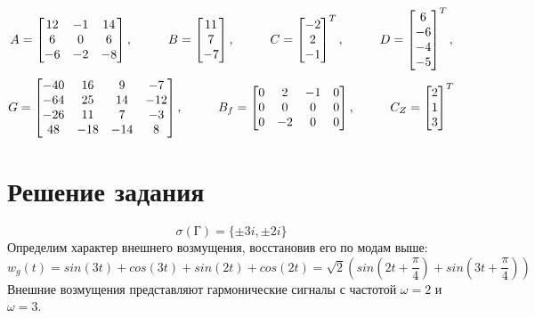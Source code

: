 $$
  A = \begin{bmatrix}
    12 & -1 & 14 \\
    6 & 0 & 6 \\
    -6 & -2 & -8 \\
\end{bmatrix}, \hspace*{1cm} B = \begin{bmatrix}
  11 \\
  7 \\
  -7 \\
\end{bmatrix}, \hspace*{1cm} C = \begin{bmatrix}
  -2 \\ 2 \\ -1 \\
\end{bmatrix}^T, \hspace*{1cm} D = \begin{bmatrix}
  6 \\
  -6 \\
  -4 \\
  -5 \\
\end{bmatrix}^T, 
$$
$$
G = \begin{bmatrix}
  -40 & 16 & 9 & -7 \\
  -64 & 25 & 14 & -12 \\
  -26 & 11 & 7 & -3 \\
  48 & -18 & -14 & 8 \\
\end{bmatrix}, \hspace*{1cm} B_f =\begin{bmatrix}
       0 & 2 & -1 & 0 \\
       0 & 0 & 0 & 0 \\
       0 & -2 & 0 & 0 \\
   \end{bmatrix}, \hspace*{1cm}
  C_Z = \begin{bmatrix}
    2 \\ 1 \\ 3 \\
\end{bmatrix}^T
$$

\section{Решение задания}

$$
  \sigma(\text{Г}) = \{ \pm 3i, \pm 2i \}
$$
Определим характер внешнего возмущения, восстановив его по модам выше:
$$
  w_g(t) = sin(3t) + cos(3t) + sin(2t) + cos(2t) = \sqrt{2}( sin(2t  + \frac{\pi}{4}) + sin(3t + \frac{ \pi}{4}) )
$$
Внешние возмущения представляют гармонические сигналы с частотой $\omega = 2$ и $\omega = 3$.

